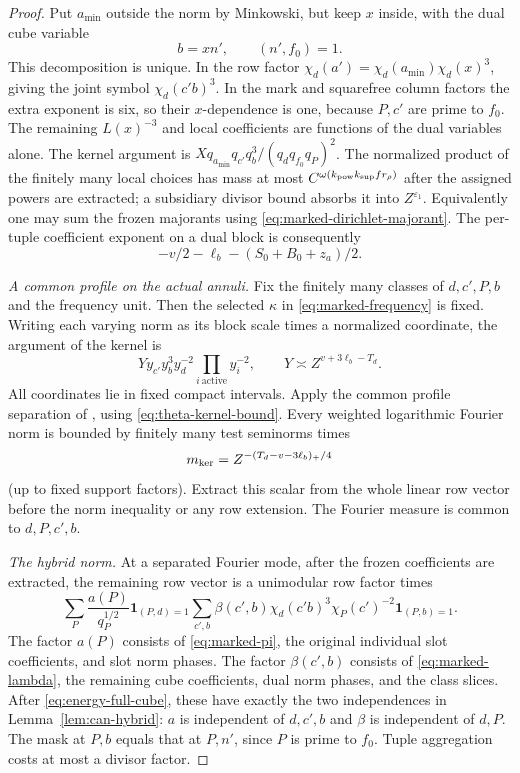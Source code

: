 \documentclass[11pt,a4paper]{article}
\numberwithin{equation}{section}
\theoremstyle{definition}
\theoremstyle{remark}
\newcommand{\eps}{\varepsilon}
\newcommand{\ind}{\mathbf 1}
\begin{document}
\begin{proof}
Put $a_{\min}$ outside the norm by Minkowski, but keep $x$ inside,
with the dual cube variable
\begin{equation}\label{eq:energy-full-cube}
 b=xn',\qquad (n',f_0)=1.
\end{equation}
This decomposition is unique.  In the row factor
$\chi_d(a')=\chi_d(a_{\min})\chi_d(x)^3$, giving the joint symbol
$\chi_d(c'b)^3$.  In the mark and squarefree column factors the
extra exponent is six, so their $x$-dependence is one, because
$P,c'$ are prime to $f_0$.  The remaining $L(x)^{-3}$ and local
coefficients are functions of the dual variables alone.
The kernel argument is $Xq_{a_{\min}}q_{c'}q_b^3/(q_dq_{f_0}q_P)^2$.
The normalized product of the finitely many local choices has
mass at most $C^{\omega(k_{\rm pow}k_{\rm sup}f r_\rho)}$ after
the assigned powers are extracted; a subsidiary divisor bound
absorbs it into $Z^{\eps_1}$.  Equivalently one may sum the frozen
majorants using \eqref{eq:marked-dirichlet-majorant}.
The per-tuple coefficient exponent on a dual block is consequently
\begin{equation}\label{eq:energy-coefficient-size}
 -v/2-\ell_b-(S_0+B_0+z_a)/2.
\end{equation}

\emph{A common profile on the actual annuli.}
Fix the finitely many classes of $d,c',P,b$ and the frequency unit.
Then the selected $\kappa$ in \eqref{eq:marked-frequency} is fixed.
Writing each varying norm as its block scale times a normalized
coordinate, the argument of the kernel is
\[
 Yy_{c'}y_b^3y_d^{-2}\prod_{i\ \mathrm{active}}y_i^{-2},
       \qquad Y\asymp Z^{v+3\ell_b-T_d}.
\]
All coordinates lie in fixed compact intervals.  Apply the common
profile separation of \cite[Lemma 5.3]{Q}, using
\eqref{eq:theta-kernel-bound}.  Every weighted logarithmic Fourier
norm is bounded by finitely many test seminorms times
\begin{equation}\label{eq:energy-common-kernel-scalar}
 m_{\rm ker}=Z^{-(T_d-v-3\ell_b)_+/4}
\end{equation}
(up to fixed support factors).  Extract this scalar from the whole
linear row vector before the norm inequality or any row extension.
The Fourier measure is common to $d,P,c',b$.

\emph{The hybrid norm.}
At a separated Fourier mode, after the frozen coefficients are
extracted, the remaining row vector is a unimodular row factor times
\[
 \sum_P\frac{a(P)}{q_P^{1/2}}\ind_{(P,d)=1}
       \sum_{c',b}\beta(c',b)\chi_d(c'b)^3\chi_P(c')^{-2}
                                          \ind_{(P,b)=1}.
\]
The factor $a(P)$ consists of \eqref{eq:marked-pi}, the original
individual slot coefficients, and slot norm phases.
The factor $\beta(c',b)$ consists of \eqref{eq:marked-lambda}, the
remaining cube coefficients, dual norm phases, and the class slices.
After \eqref{eq:energy-full-cube}, these have exactly the two
independences in Lemma~\ref{lem:can-hybrid}: $a$ is independent of
$d,c',b$ and $\beta$ is independent of $d,P$.  The mask at $P,b$
equals that at $P,n'$, since $P$ is prime to $f_0$.
Tuple aggregation costs at most a divisor factor.


\end{proof}
\end{document}
